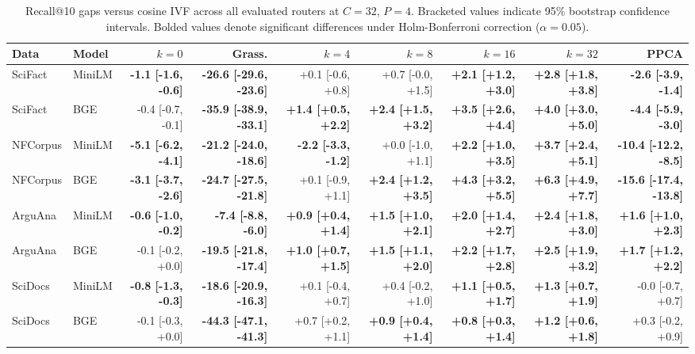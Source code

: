 \begin{table}[t]
\centering
\caption{Recall@10 gaps versus cosine IVF across all evaluated routers at $C{=}32$, $P{=}4$. Bracketed values indicate 95\% bootstrap confidence intervals. Bolded values denote significant differences under Holm-Bonferroni correction ($\alpha = 0.05$).}
\label{tab:deltas}
\scriptsize
\setlength{\tabcolsep}{2.4pt}
\begin{tabular}{llrrrrrrr}
\toprule
Data & Model & $k{=}0$ & Grass. & $k{=}4$ & $k{=}8$ & $k{=}16$ & $k{=}32$ & PPCA \\
\midrule
SciFact & MiniLM & \textbf{-1.1 [-1.6, -0.6]} & \textbf{-26.6 [-29.6, -23.6]} & +0.1 [-0.6, +0.8] & +0.7 [-0.0, +1.5] & \textbf{+2.1 [+1.2, +3.0]} & \textbf{+2.8 [+1.8, +3.8]} & \textbf{-2.6 [-3.9, -1.4]} \\
SciFact & BGE & -0.4 [-0.7, -0.1] & \textbf{-35.9 [-38.9, -33.1]} & \textbf{+1.4 [+0.5, +2.2]} & \textbf{+2.4 [+1.5, +3.2]} & \textbf{+3.5 [+2.6, +4.4]} & \textbf{+4.0 [+3.0, +5.0]} & \textbf{-4.4 [-5.9, -3.0]} \\
NFCorpus & MiniLM & \textbf{-5.1 [-6.2, -4.1]} & \textbf{-21.2 [-24.0, -18.6]} & \textbf{-2.2 [-3.3, -1.2]} & +0.0 [-1.0, +1.1] & \textbf{+2.2 [+1.0, +3.5]} & \textbf{+3.7 [+2.4, +5.1]} & \textbf{-10.4 [-12.2, -8.5]} \\
NFCorpus & BGE & \textbf{-3.1 [-3.7, -2.6]} & \textbf{-24.7 [-27.5, -21.8]} & +0.1 [-0.9, +1.1] & \textbf{+2.4 [+1.2, +3.5]} & \textbf{+4.3 [+3.2, +5.5]} & \textbf{+6.3 [+4.9, +7.7]} & \textbf{-15.6 [-17.4, -13.8]} \\
ArguAna & MiniLM & \textbf{-0.6 [-1.0, -0.2]} & \textbf{-7.4 [-8.8, -6.0]} & \textbf{+0.9 [+0.4, +1.4]} & \textbf{+1.5 [+1.0, +2.1]} & \textbf{+2.0 [+1.4, +2.7]} & \textbf{+2.4 [+1.8, +3.0]} & \textbf{+1.6 [+1.0, +2.3]} \\
ArguAna & BGE & -0.1 [-0.2, +0.0] & \textbf{-19.5 [-21.8, -17.4]} & \textbf{+1.0 [+0.7, +1.5]} & \textbf{+1.5 [+1.1, +2.0]} & \textbf{+2.2 [+1.7, +2.8]} & \textbf{+2.5 [+1.9, +3.2]} & \textbf{+1.7 [+1.2, +2.2]} \\
SciDocs & MiniLM & \textbf{-0.8 [-1.3, -0.3]} & \textbf{-18.6 [-20.9, -16.3]} & +0.1 [-0.4, +0.7] & +0.4 [-0.2, +1.0] & \textbf{+1.1 [+0.5, +1.7]} & \textbf{+1.3 [+0.7, +1.9]} & -0.0 [-0.7, +0.7] \\
SciDocs & BGE & -0.1 [-0.3, +0.0] & \textbf{-44.3 [-47.1, -41.3]} & +0.7 [+0.2, +1.1] & \textbf{+0.9 [+0.4, +1.4]} & \textbf{+0.8 [+0.3, +1.4]} & \textbf{+1.2 [+0.6, +1.8]} & +0.3 [-0.2, +0.9] \\

\end{tabular}
\end{table}
